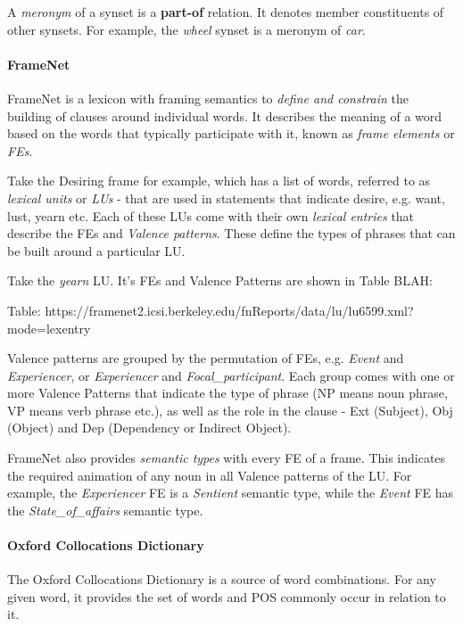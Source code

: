 A \textit{meronym} of a synset is a \textbf{part-of} relation. It denotes member constituents of other synsets. For example, the \textit{wheel} synset is a meronym of \textit{car}.


\paragraph{FrameNet}
\label{sec:fn}
FrameNet\cite{baker1998berkeley} is a lexicon with framing semantics to \textit{define and constrain} the building of clauses around individual words. It describes the meaning of a word based on the words that typically participate with it, known as \textit{frame elements} or \textit{FEs}.

Take the Desiring frame for example, which has a list of words, referred to as \textit{lexical units} or \textit{LUs} - that are used in statements that indicate desire, e.g. want, lust, yearn etc. Each of these LUs come with their own \textit{lexical entries} that describe the FEs and \textit{Valence patterns}. These define the types of phrases that can be built around a particular LU.

Take the \textit{yearn} LU. It's FEs and Valence Patterns are shown in Table BLAH:

Table: https://framenet2.icsi.berkeley.edu/fnReports/data/lu/lu6599.xml?mode=lexentry

Valence patterns are grouped by the permutation of FEs, e.g. \textit{Event} and \textit{Experiencer}, or \textit{Experiencer} and \textit{Focal\_participant}. Each group comes with one or more Valence Patterns that indicate the type of phrase (NP means noun phrase, VP means verb phrase etc.), as well as the role in the clause - Ext (Subject), Obj (Object) and Dep (Dependency or Indirect Object).

FrameNet also provides \textit{semantic types} with every FE of a frame. This indicates the required animation of any noun in all Valence patterns of the LU. For example, the \textit{Experiencer} FE is a \textit{Sentient} semantic type, while the \textit{Event} FE has the \textit{State\_of\_affairs} semantic type.

\paragraph{Oxford Collocations Dictionary}
The Oxford Collocations Dictionary\cite{crowther2003oxford} is a source of word combinations. For any given word, it provides the set of words and POS commonly occur in relation to it.

